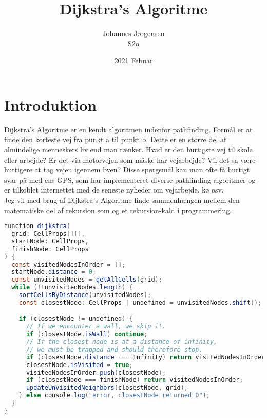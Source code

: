 \documentclass[12pt]{article}
\begin{document}
\title{Dijkstra's Algoritme}
\author{Johannes Jørgensen\\ S2o}
\date{2021 Febuar}
\maketitle
\pagebreak
\tableofcontents
\pagebreak
\section{Introduktion}
Dijkstra's Algoritme er en kendt algoritmen indenfor pathfinding. Formål er at finde den korteste vej fra punkt a til punkt b. Dette er en større del af almindelige menneskers liv end man tænker. Hvad er den hurtigste vej til skole eller arbejde? Er det via motorvejen som måske har vejarbejde? Vil det så være hurtigere at tag vejen igennem byen? Disse spørgsmål kan man ofte få hurtigt svar på med ens GPS, som har implementeret diverse pathfinding algoritmer og er tilkoblet internettet med de seneste nyheder om vejarbejde, kø osv. 
\\Jeg vil med brug af Dijkstra's Algoritme finde sammenhængen mellem den matematiske del af rekursion som og et rekursion-kald i programmering.  

\begin{lstlisting}[language=Java, caption=Dijkstra's Algoritme]
function dijkstra(
  grid: CellProps[][],
  startNode: CellProps,
  finishNode: CellProps
) {
  const visitedNodesInOrder = [];
  startNode.distance = 0;
  const unvisitedNodes = getAllCells(grid);
  while (!!unvisitedNodes.length) {
    sortCellsByDistance(unvisitedNodes);
    const closestNode: CellProps | undefined = unvisitedNodes.shift();

    if (closestNode != undefined) {
      // If we encounter a wall, we skip it.
      if (closestNode.isWall) continue;
      // If the closest node is at a distance of infinity,
      // we must be trapped and should therefore stop.
      if (closestNode.distance === Infinity) return visitedNodesInOrder;
      closestNode.isVisited = true;
      visitedNodesInOrder.push(closestNode);
      if (closestNode === finishNode) return visitedNodesInOrder;
      updateUnvisitedNeighbors(closestNode, grid);
    } else console.log("error, closestNode returned 0");
  }
}
\end{lstlisting}
\end{document}
